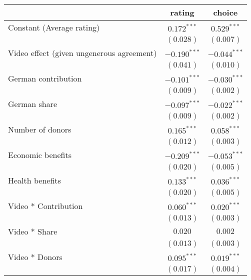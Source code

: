 
\begin{table}[h!]
\begin{center}
\begin{tabular}{l c c}
\hline
 & rating & choice \\
\hline
Constant (Average rating)                 & $0.172^{***}$  & $0.529^{***}$  \\
                                          & $(0.028)$      & $(0.007)$      \\
Video effect (given ungenerous agreement) & $-0.190^{***}$ & $-0.044^{***}$ \\
                                          & $(0.041)$      & $(0.010)$      \\
German contribution                       & $-0.101^{***}$ & $-0.030^{***}$ \\
                                          & $(0.009)$      & $(0.002)$      \\
German share                              & $-0.097^{***}$ & $-0.022^{***}$ \\
                                          & $(0.009)$      & $(0.002)$      \\
Number of donors                          & $0.165^{***}$  & $0.058^{***}$  \\
                                          & $(0.012)$      & $(0.003)$      \\
Economic benefits                         & $-0.209^{***}$ & $-0.053^{***}$ \\
                                          & $(0.020)$      & $(0.005)$      \\
Health benefits                           & $0.133^{***}$  & $0.036^{***}$  \\
                                          & $(0.020)$      & $(0.005)$      \\
Video * Contribution                      & $0.060^{***}$  & $0.020^{***}$  \\
                                          & $(0.013)$      & $(0.003)$      \\
Video * Share                             & $0.020$        & $0.002$        \\
                                          & $(0.013)$      & $(0.003)$      \\
Video * Donors                            & $0.095^{***}$  & $0.019^{***}$  \\
                                          & $(0.017)$      & $(0.004)$      \\

\end{tabular}
\end{center}
\end{table}
